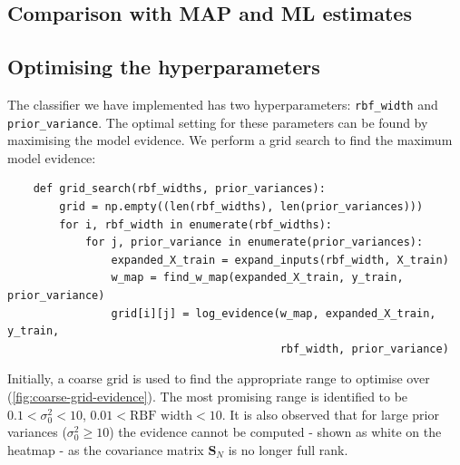 \documentclass[a4paper]{article}
\begin{document}
    \subsection{Comparison with MAP and ML estimates}

    \subsection{Optimising the hyperparameters}
    The classifier we have implemented has two hyperparameters: \verb`rbf_width` and \verb`prior_variance`. The optimal setting for these parameters can be found by maximising the model evidence. We perform a grid search to find the maximum model evidence:
    \begin{verbatim}
    def grid_search(rbf_widths, prior_variances):
        grid = np.empty((len(rbf_widths), len(prior_variances)))
        for i, rbf_width in enumerate(rbf_widths):
            for j, prior_variance in enumerate(prior_variances):
                expanded_X_train = expand_inputs(rbf_width, X_train)
                w_map = find_w_map(expanded_X_train, y_train, prior_variance)
                grid[i][j] = log_evidence(w_map, expanded_X_train, y_train,
                                          rbf_width, prior_variance)
    \end{verbatim}
    Initially, a coarse grid is used to find the appropriate range to optimise over (\autoref{fig:coarse-grid-evidence}).
    The most promising range is identified to be $0.1 < \sigma_0^2 < 10$, $0.01 < \text{RBF width} < 10$.
    It is also observed that for large prior variances ($\sigma_0^2 \geq 10$) the evidence cannot be computed - shown as white on the heatmap - as the covariance matrix $\bm{S}_N$ is no longer full rank.
\end{document}
